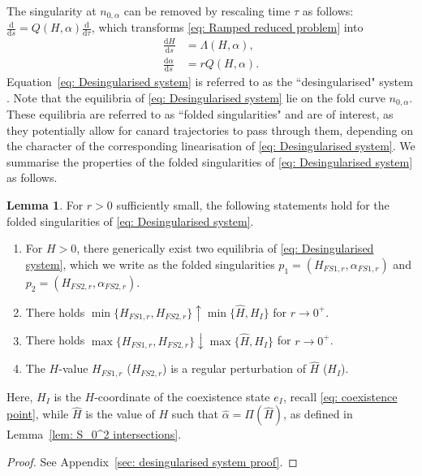 \documentclass{article}
\theoremstyle{definition}
\numberwithin{equation}{section}
\newtheorem{lem}[prop]{Lemma}
\newcommand{\dd}{\mathrm{d}}
\begin{document}
The singularity at $n_{0, \alpha}$ can be removed by rescaling time $\tau$ as follows: $\frac{\dd}{\dd s}=Q(H, \alpha)\frac{\dd}{\dd\tau}$, which transforms \eqref{eq: Ramped reduced problem} into 
\begin{equation}
    \begin{aligned}
        \frac{\dd H}{\dd s}&=\Lambda(H,\alpha),\\
        \frac{\dd\alpha}{\dd s}&=rQ(H, \alpha).
        \label{eq: Desingularised system}
    \end{aligned}
\end{equation}
Equation~\eqref{eq: Desingularised system}
is referred to as the ``desingularised" system \cite{SZMOLYAN2001419, Canards}. Note that the equilibria of \eqref{eq: Desingularised system} lie on the fold curve $n_{0,\alpha}$. These equilibria are referred to as ``folded singularities" and are of interest, as they potentially allow for canard trajectories to pass through them, depending on the character of the corresponding linearisation of \eqref{eq: Desingularised system}. We summarise the properties of the folded singularities of \eqref{eq: Desingularised system} as follows.
\begin{lem}\label{lem: desingularised system} For $r>0$ sufficiently small, the following statements hold for the folded singularities of \eqref{eq: Desingularised system}.
\begin{enumerate}
    \item For $H>0$, there generically exist two equilibria of \eqref{eq: Desingularised system}, which we write as the folded singularities $p_1=(H_{FS1,r},\alpha_{FS1,r})$ and $p_2=(H_{FS2,r},\alpha_{FS2,r})$.
    \item There holds $\min\{H_{FS1,r},H_{FS2,r}\}\uparrow \min\{\hat{H},H_{I}\}$ for $r\to 0^+$.
    \item There holds $\max\{H_{FS1,r},H_{FS2,r}\}\downarrow \max\{\hat{H},H_{I}\}$ for $r\to 0^+$.
    \item The $H$-value $H_{FS1,r}$ ($H_{FS2,r}$) is a regular perturbation of $\hat{H}$ ($H_{I}$). 
\end{enumerate}
Here, $H_{I}$ is the $H$-coordinate of the coexistence state $e_I$, recall \eqref{eq: coexistence point}, while $\hat{H}$ is the value of $H$ such that $\hat{\alpha}=\Pi(\hat{H})$, as defined in Lemma~\ref{lem: S_0^2 intersections}.
\end{lem}
\begin{proof}
See Appendix~\ref{sec: desingularised system proof}.
\end{proof}
\end{document}
